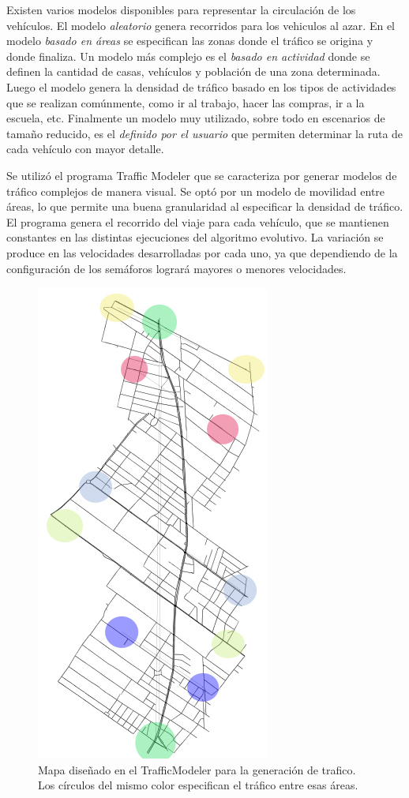 Existen varios modelos disponibles para representar la circulación de los vehículos. El modelo \emph{aleatorio} genera recorridos para los vehiculos al azar. En el modelo \emph{basado en áreas} se especifican las zonas donde el tráfico se origina y donde finaliza. Un modelo más complejo es el \emph{basado en actividad} donde se definen la cantidad de casas, vehículos y población de una zona determinada. Luego el modelo genera la densidad de tráfico basado en los tipos de actividades que se realizan comúnmente, como ir al trabajo, hacer las compras, ir a la escuela, etc. Finalmente un modelo muy utilizado, sobre todo en escenarios de tamaño reducido, es el \emph{definido por el usuario} que permiten determinar la ruta de cada vehículo con mayor detalle.

Se utilizó el programa Traffic Modeler \citep{TrafficModeler} que se caracteriza por generar modelos de tráfico complejos de manera visual. Se optó por un modelo de movilidad entre áreas, lo que permite una buena granularidad al especificar la densidad de tráfico. El programa genera el recorrido del viaje para cada vehículo, que se mantienen constantes en las distintas ejecuciones del algoritmo evolutivo. La variación se produce en las velocidades desarrolladas por cada uno, ya que dependiendo de la configuración de los semáforos logrará mayores o menores velocidades.



\begin{figure}[h]
	\centering
	\includegraphics[width=0.5\linewidth]{Figures/areaflow1}
	\caption[Mapa diseñado en el TrafficModeler para la generación de tráfico.]{Mapa diseñado en el TrafficModeler para la generación de trafico. Los círculos del mismo color especifican el tráfico entre esas áreas. }
	\label{fig:areaflow1}
\end{figure}


